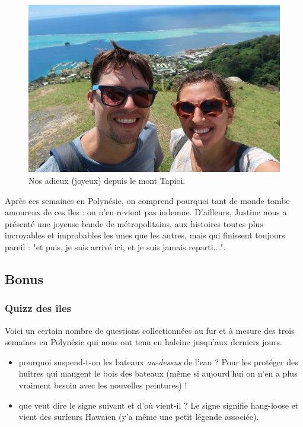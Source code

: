 \begin{figure}
\centering
\includegraphics{images/20180820_raiatea.JPG}
\caption{Nos adieux (joyeux) depuis le mont Tapioi.}
\end{figure}

Après ces semaines en Polynésie, on comprend pourquoi tant de monde
tombe amoureux de ces îles : on n'en revient pas indemne. D'ailleurs,
Justine nous a présenté une joyeuse bande de métropolitains, aux
histoires toutes plus incroyables et improbables les unes que les
autres, mais qui finissent toujours pareil : "et puis, je suis arrivé
ici, et je suis jamais reparti...".

\hypertarget{bonus}{%
\subsection{Bonus}\label{bonus}}

\hypertarget{quizz-des-uxeeles}{%
\subsubsection{Quizz des îles}\label{quizz-des-uxeeles}}

Voici un certain nombre de questions collectionnées au fur et à mesure
des trois semaines en Polynésie qui nous ont tenu en haleine jusqu'aux
derniers jours.

\begin{itemize}
\tightlist
\item
  pourquoi suspend-t-on les bateaux \emph{au-dessus} de l'eau ? Pour les
  protéger des huîtres qui mangent le bois des bateaux (même si
  aujourd'hui on n'en a plus vraiment besoin avec les nouvelles
  peintures) !
\item
  que veut dire le signe suivant et d'où vient-il ? Le signe signifie
  hang-loose et vient des surfeurs Hawaïen (y'a même une petit légende
  associée).
\end{itemize}

